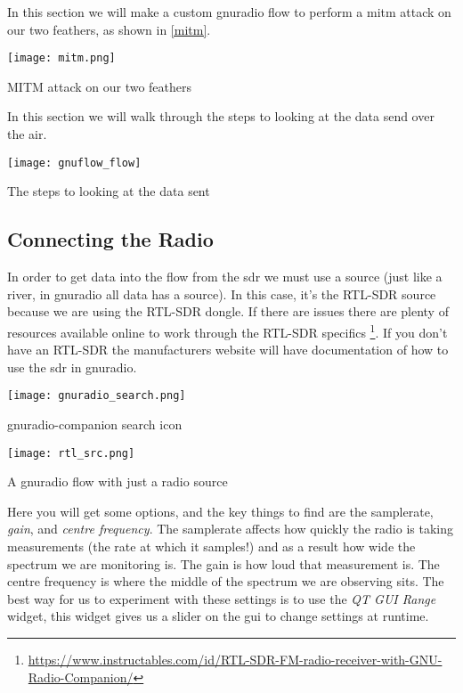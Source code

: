 In this section we will make a custom gnuradio flow to perform a \gls{mitm} attack on our two feathers, as shown in \cref{mitm}.

\centrefigurestart
\texttt{[image: mitm.png]}
\caption{MITM attack on our two feathers}
\label{mitm}
\centrefigureend

In this section we will walk through the steps to looking at the data send over the air.

\centrefigurestart
\texttt{[image: gnuflow\_flow]}
\caption{The steps to looking at the data sent}
\label{mitm}
\centrefigureend


\subsection{Connecting the Radio}
In order to get data into the flow from the \gls{sdr} we must use a \gls{source} (just like a river, in gnuradio all data has a source). In this case, it's the RTL-SDR \gls{source} because we are using the RTL-SDR dongle. If there are issues there are plenty of resources available online to work through the RTL-SDR specifics \footnote{\url{https://www.instructables.com/id/RTL-SDR-FM-radio-receiver-with-GNU-Radio-Companion/}}. If you don't have an RTL-SDR the manufacturers website will have documentation of how to use the \gls{sdr} in gnuradio.


\centrefigurestart
\texttt{[image: gnuradio\_search.png]}
\caption{gnuradio-companion search icon}
\label{gnufind}
\centrefigureend


\centrefigurestart
\texttt{[image: rtl\_src.png]}
\caption{A gnuradio flow with just a radio source}
\label{gnusource}
\centrefigureend


Here you will get some options, and the key things to find are the \gls{samplerate}, \textit{gain}, and \textit{centre frequency}. The \gls{samplerate} affects how quickly the radio is taking measurements (the rate at which it samples!) and as a result how wide the spectrum we are monitoring is. The gain is how loud that measurement is. The centre frequency is where the middle of the spectrum we are observing sits. The best way for us to experiment with these settings is to use the \textit{QT GUI Range} widget, this widget gives us a slider on the \gls{gui} to change settings at runtime. 

